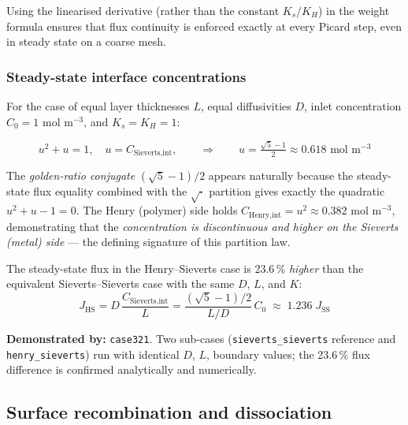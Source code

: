 \documentclass[11pt,a4paper]{article}
\newcommand{\mol}{\,\text{mol}}
\newcommand{\m}{\,\text{m}}
\newcommand{\caseref}[1]{\texttt{\color{casegreen}#1}}
\begin{document}
Using the linearised derivative (rather than the constant $K_s/K_H$) in the
weight formula ensures that flux continuity is enforced exactly at every
Picard step, even in steady state on a coarse mesh.

\subsubsection{Steady-state interface concentrations}

For the case of equal layer thicknesses $L$, equal diffusivities $D$, inlet
concentration $C_0 = 1\,\mol\,\m^{-3}$, and $K_s = K_H = 1$:

\begin{tcolorbox}[eqbox,title={Analytical interface concentrations (equal $D$, $L$, $K$)}]
\begin{equation}\label{eq:hs_ss}
  u^2 + u = 1,
  \quad u = C_{\text{Sieverts,int}},
  \qquad\Rightarrow\qquad
  u = \tfrac{\sqrt{5}-1}{2} \approx 0.618\,\mol\,\m^{-3}
\end{equation}
\end{tcolorbox}

The \emph{golden-ratio conjugate} $(\sqrt5-1)/2$ appears naturally because
the steady-state flux equality combined with the $\sqrt{\cdot}$ partition gives
exactly the quadratic $u^2+u-1=0$.  The Henry (polymer) side holds
$C_\text{Henry,int} = u^2 \approx 0.382\,\mol\,\m^{-3}$, demonstrating that the
\emph{concentration is discontinuous and higher on the Sieverts (metal) side}
— the defining signature of this partition law.

The steady-state flux in the Henry--Sieverts case is 23.6\,\% \emph{higher}
than the equivalent Sieverts--Sieverts case with the same $D$, $L$, and $K$:
\begin{equation}\label{eq:hs_flux}
  J_\text{HS} = D\,\frac{C_\text{Sieverts,int}}{L}
  = \frac{(\sqrt{5}-1)/2}{L/D}\,C_0
  \;\approx\; 1.236\;J_\text{SS}
\end{equation}

\begin{tcolorbox}[casebox]
  \textbf{Demonstrated by:} \caseref{case321}.
  Two sub-cases (\texttt{sieverts\_sieverts} reference and
  \texttt{henry\_sieverts}) run with identical $D$, $L$, boundary values;
  the 23.6\,\% flux difference is confirmed analytically and numerically.
\end{tcolorbox}

\subsection{Surface recombination and dissociation}
\label{sec:bc_recomb}
\end{document}

